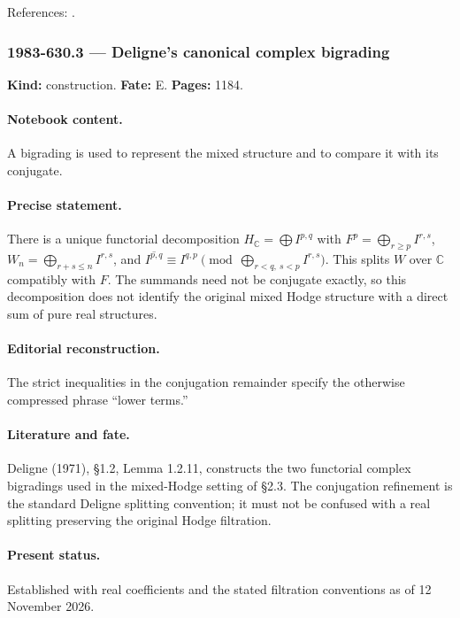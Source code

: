 \noindent References: \citep{deligne1971hodge,bunkenikolaustamme2018regulator}.\par

\subsubsection{1983-630.3 --- Deligne’s canonical complex bigrading}

\label{item:1983-630.3}

\noindent\textbf{Kind:} construction. \textbf{Fate:} E. \textbf{Pages:} 1184.\par

\paragraph{Notebook content.} A bigrading is used to represent the mixed structure and to compare it with its conjugate.

\paragraph{Precise statement.} There is a unique functorial decomposition \(H_{\mathbb C}=\bigoplus I^{p,q}\) with \(F^p=\bigoplus_{r\ge p}I^{r,s}\), \(W_n=\bigoplus_{r+s\le n}I^{r,s}\), and \(\overline{I^{p,q}}\equiv I^{q,p}\pmod{\bigoplus_{r<q,\ s<p}I^{r,s}}\). This splits \(W\) over \(\mathbb C\) compatibly with \(F\). The summands need not be conjugate exactly, so this decomposition does not identify the original mixed Hodge structure with a direct sum of pure real structures.

\paragraph{Editorial reconstruction.} The strict inequalities in the conjugation remainder specify the otherwise compressed phrase “lower terms.”

\paragraph{Literature and fate.} Deligne (1971), \S1.2, Lemma 1.2.11, constructs the two functorial complex bigradings used in the mixed-Hodge setting of \S2.3. The conjugation refinement is the standard Deligne splitting convention; it must not be confused with a real splitting preserving the original Hodge filtration.

\paragraph{Present status.} Established with real coefficients and the stated filtration conventions as of 12 November 2026.

